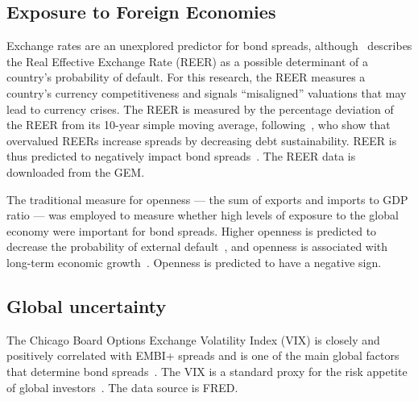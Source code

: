\documentclass[12pt]{article}
\begin{document}
\subsection{Exposure to Foreign Economies}
Exchange rates are an unexplored predictor for bond spreads, although~\textcite{edwards86} describes the Real Effective Exchange Rate (REER) as a possible determinant of a country's probability of default. For this research, the REER measures a country's currency competitiveness and signals ``misaligned'' valuations that may lead to currency crises. The REER is measured by the percentage deviation of the REER from its 10-year simple moving average, following~\textcite{jahjah13}, who show that overvalued REERs increase spreads by decreasing debt sustainability. REER is thus predicted to negatively impact bond spreads~\parencite{tebaldi18}. The REER data is downloaded from the GEM.

The traditional measure for openness --- the sum of exports and imports to GDP ratio --- was employed to measure whether high levels of exposure to the global economy were important for bond spreads. Higher openness is predicted to decrease the probability of external default~\parencite{bellas10}, and openness is associated with long-term economic growth~\parencite{ulasan12}. Openness is  predicted to have a negative sign.
\subsection{Global uncertainty}
The Chicago Board Options Exchange Volatility Index (VIX) is closely and positively correlated with EMBI+ spreads and is one of the main global factors that determine bond spreads~\parencite{jaramillo11}. The VIX is a standard proxy for the risk appetite of global investors~\parencite{csonto13}. The data source is FRED.
\end{document}
